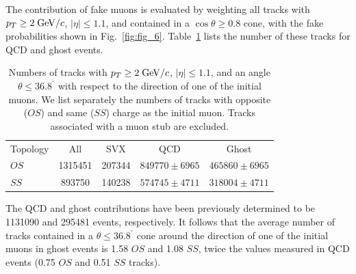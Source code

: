 \documentclass[aps,prd,preprint,floatfix,nofootinbib,superscriptaddress,showpacs,amssymb]{revtex4}
\def\deg{^\circ}
\begin{document}
 The contribution of fake muons is evaluated by weighting all tracks
 with $p_T \geq 2 \; {\rm GeV/}c$, $|\eta| \leq 1.1$, and contained in a
 $\cos \theta \geq 0.8$ cone, with the fake probabilities shown in 
 Fig.~\ref{fig:fig_6}. Table~\ref{tab:tab_6} lists the number of these 
 tracks for QCD and ghost events.
 \begin{table}
 \caption[]{Numbers of tracks with $p_T \geq 2 \; {\rm GeV/}c$, $|\eta| \leq 1.1$,
            and an angle $\theta \leq 36.8^{\deg}$ with respect to the 
            direction of one of the initial muons. We list separately the
            numbers of tracks with opposite ($OS$) and same ($SS$) charge as 
            the initial muon. Tracks  associated
            with a muon stub are excluded.}
 \begin{center}
 \begin{ruledtabular}
 \begin{tabular}{lcccc}
  Topology &  All     &    SVX  &         QCD       &       Ghost       \\
  $OS $    &  1315451 &  207344 & $849770 \pm 6965$ & $465860 \pm 6965$ \\
  $SS $    &   893750 &  140238 & $574745 \pm 4711$ & $318004 \pm 4711$ \\
 \end{tabular}
 \end{ruledtabular}
 \end{center}
 \label{tab:tab_6}
 \end{table} 
  The QCD and ghost contributions have been previously determined to be
  1131090 and 295481 events, respectively. It follows that the average
  number of tracks contained in a $\theta \leq 36.8^{\deg}$ cone around
  the direction of one of the initial muons in ghost events is 1.58
  $OS$ and 1.08 $SS$, twice the values measured in QCD events (0.75 $OS$
  and 0.51 $SS$ tracks).
\end{document}
